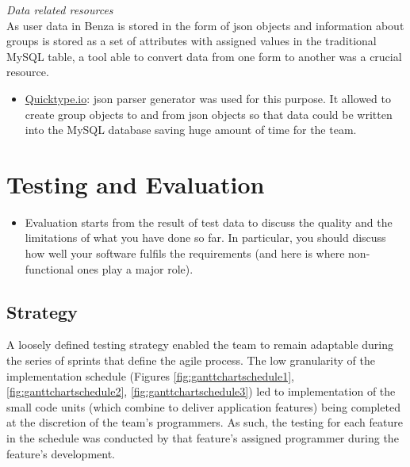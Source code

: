 \documentclass{article}
\begin{document}
    
    \emph{Data related resources}\\
    As user data in Benza is stored in the form of \acrshort{json} objects and information about groups is stored as a set of attributes with assigned values in the traditional MySQL table, a tool able to convert data from one form to another was a crucial resource.
    \begin{itemize}
        \item \href{https://quicktype.io }{Quicktype.io}: \acrshort{json} parser generator was used for this purpose. It allowed to create group objects %
        to and from \acrshort{json} objects so that data could be written into the MySQL database saving huge amount of time for the team.
    \end{itemize}
  
\newpage
\section{Testing and Evaluation}
\label{sec:testing}
    \begin{itemize}
        \item Evaluation starts from the result of test data to discuss the quality and the limitations of what you have done so far. In particular, you should discuss how well your software fulfils the requirements (and here is where non-functional ones play a major role).
    \end{itemize}

    \subsection{Strategy}
    \label{subsec:testingstrategy}
    A loosely defined testing strategy enabled the team to remain adaptable during the series of sprints that define the agile process. The low granularity of the implementation schedule (Figures \ref{fig:ganttchartschedule1}, \ref{fig:ganttchartschedule2}, \ref{fig:ganttchartschedule3}) led to implementation of the small code units (which combine to deliver application features) being completed at the discretion of the team's programmers. As such, the testing for each feature in the schedule was conducted by that feature's assigned programmer during the feature's development. \par
    
\end{document}
